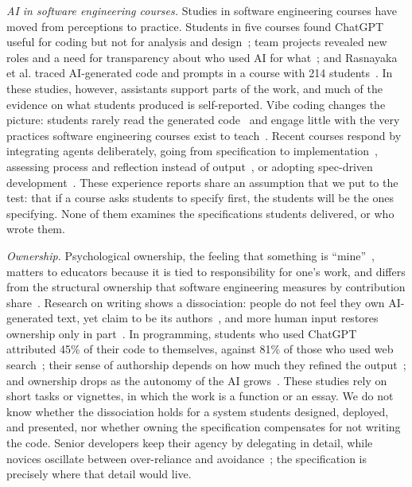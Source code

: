 \documentclass[conference]{IEEEtran}
\begin{document}
\emph{AI in software engineering courses.} Studies in software engineering courses have moved from perceptions to practice. Students in five courses found ChatGPT useful for coding but not for analysis and design~\cite{baresi2025students}; team projects revealed new roles and a need for transparency about who used AI for what~\cite{kharrufa2026llms,salomon2025exploration}; and Rasnayaka et al. traced AI-generated code and prompts in a course with 214 students~\cite{rasnayaka2024empirical}. In these studies, however, assistants support parts of the work, and much of the evidence on what students produced is self-reported. Vibe coding changes the picture: students rarely read the generated code~\cite{geng2026vibe} and engage little with the very practices software engineering courses exist to teach~\cite{gama2026vibes}. Recent courses respond by integrating agents deliberately, going from specification to implementation~\cite{wang2026specifications}, assessing process and reflection instead of output~\cite{fein2026aidriven}, or adopting spec-driven development~\cite{martin2026aisdlc}. These experience reports share an assumption that we put to the test: that if a course asks students to specify first, the students will be the ones specifying. None of them examines the specifications students delivered, or who wrote them.

\emph{Ownership.} Psychological ownership, the feeling that something is ``mine''~\cite{pierce2001}, matters to educators because it is tied to responsibility for one's work, and differs from the structural ownership that software engineering measures by contribution share~\cite{bird2011dont}. Research on writing shows a dissociation: people do not feel they own AI-generated text, yet claim to be its authors~\cite{draxler2024}, and more human input restores ownership only in part~\cite{joshi2025writing}. In programming, students who used ChatGPT attributed 45\% of their code to themselves, against 81\% of those who used web search~\cite{bergh2026cognition}; their sense of authorship depends on how much they refined the output~\cite{ye2026attribution}; and ownership drops as the autonomy of the AI grows~\cite{seo2026whose}. These studies rely on short tasks or vignettes, in which the work is a function or an essay. We do not know whether the dissociation holds for a system students designed, deployed, and presented, nor whether owning the specification compensates for not writing the code. Senior developers keep their agency by delegating in detail, while novices oscillate between over-reliance and avoidance~\cite{feng2026junior,huang2025dontvibe}; the specification is precisely where that detail would live.
\end{document}
